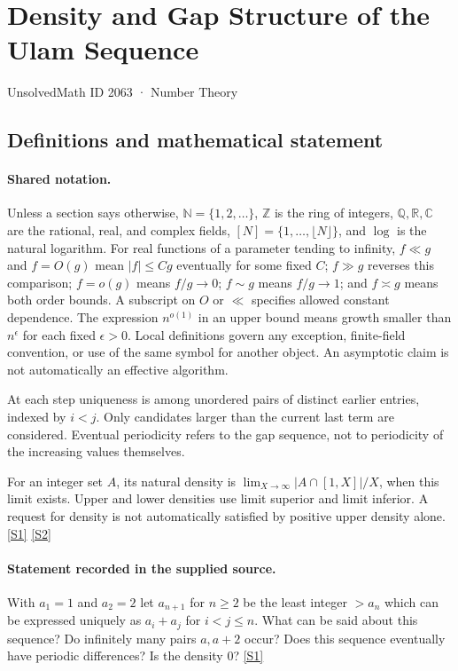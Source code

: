 \documentclass[11pt,a4paper]{article}
\newcommand{\N}{\mathbb{N}}
\newcommand{\Z}{\mathbb{Z}}
\newcommand{\Q}{\mathbb{Q}}
\newcommand{\R}{\mathbb{R}}
\newcommand{\C}{\mathbb{C}}
\newcommand{\sref}[2]{\hyperlink{source:#1:#2}{[S#2]}}
\begin{document}

\setcounter{section}{2062}

\section{Density and Gap Structure of the Ulam Sequence}\label{2063}

{\small\sffamily UnsolvedMath ID 2063 · Number Theory}

\subsection{Definitions and mathematical statement}

\paragraph{Shared notation.}Unless a section says otherwise, $\N=\{1,2,\ldots\}$,
$\Z$ is the ring of integers, $\Q,\R,\C$ are the rational, real, and complex
fields, $[N]=\{1,\ldots,\lfloor N\rfloor\}$, and $\log$ is the natural
logarithm. For real functions of a parameter tending to infinity,
$f\ll g$ and $f=O(g)$ mean $|f|\leq Cg$ eventually for some fixed $C$;
$f\gg g$ reverses this comparison; $f=o(g)$ means $f/g\to0$;
$f\sim g$ means $f/g\to1$; and $f\asymp g$ means both order bounds.
A subscript on $O$ or $\ll$ specifies allowed constant dependence.
The expression $n^{o(1)}$ in an upper bound means growth smaller than
$n^\epsilon$ for each fixed $\epsilon>0$. Local definitions govern any
exception, finite-field convention, or use of the same symbol for another
object. An asymptotic claim is not automatically an effective algorithm.



At each step uniqueness is among unordered pairs of distinct earlier entries, indexed by $i<j$. Only candidates larger than the current last term are considered. Eventual periodicity refers to the gap sequence, not to periodicity of the increasing values themselves.

For an integer set $A$, its natural density is $\lim_{X\to\infty}|A\cap[1,X]|/X$, when this limit exists. Upper and lower densities use limit superior and limit inferior. A request for density is not automatically satisfied by positive upper density alone. \sref{2063}{1} \sref{2063}{2}

\paragraph{Statement recorded in the supplied source.}
With $a_1=1$ and $a_2=2$ let $a_{n+1}$ for $n\geq 2$ be the least integer $>a_n$ which can be expressed uniquely as $a_i+a_j$ for $i<j\leq n$.
What can be said about this sequence? Do infinitely many pairs $a,a+2$ occur? Does this sequence eventually have periodic differences? Is the density $0$? \sref{2063}{1}
\end{document}
